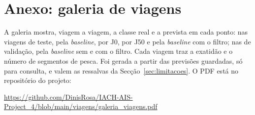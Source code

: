\documentclass{article}
\begin{document}
\section{Anexo: galeria de viagens}
\label{sec:galeria}

A galeria mostra, viagem a viagem, a classe real e a prevista em cada ponto: nas \resSelViagens{} viagens de teste, pela \emph{baseline}, por J0, por J50 e pela \emph{baseline} com o filtro; nas \resVaViagens{} de validação, pela \emph{baseline} sem e com o filtro. Cada viagem traz a exatidão e o número de segmentos de pesca. Foi gerada a partir das previsões guardadas, só para consulta, e valem as ressalvas da Secção~\ref{sec:limitacoes}. O PDF está no repositório do projeto:

{\small{}\url{https://github.com/DinisRosa/IACH-AIS-Project_4/blob/main/viagens/galeria_viagens.pdf}}
\end{document}
